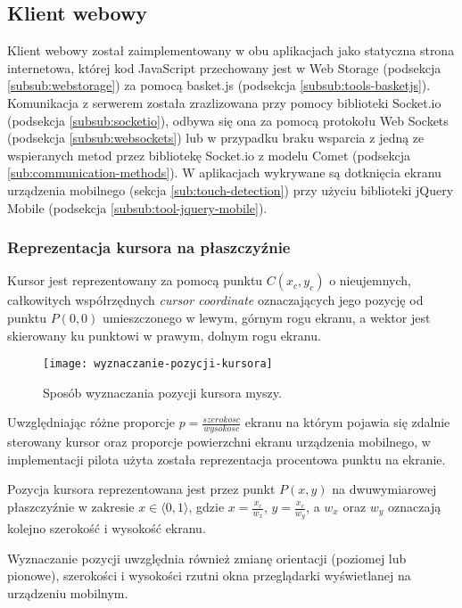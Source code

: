 \subsection{Klient webowy}
\label{subsub:impl-webclient}

Klient webowy został zaimplementowany w obu aplikacjach jako statyczna strona internetowa, której kod JavaScript przechowany jest w Web Storage (podsekcja \ref{subsub:webstorage}) za pomocą basket.js (podsekcja \ref{subsub:tools-basketjs}). Komunikacja z serwerem została zrazlizowana przy pomocy biblioteki Socket.io (podsekcja \ref{subsub:socketio}), odbywa się ona za pomocą protokołu Web Sockets (podsekcja \ref{subsub:websockets}) lub w przypadku braku wsparcia z jedną ze wspieranych metod przez bibliotekę Socket.io z modelu Comet (podsekcja \ref{sub:communication-methods}). W aplikacjach wykrywane są dotknięcia ekranu urządzenia mobilnego (sekcja \ref{sub:touch-detection}) przy użyciu biblioteki jQuery Mobile (podsekcja \ref{subsub:tool-jquery-mobile}).

\subsubsection{Reprezentacja kursora na płaszczyźnie}
\label{subsub:cursor-representation}

Kursor jest reprezentowany za pomocą punktu \(C(x_{c}, y_{c})\) o nieujemnych, całkowitych współrzędnych \emph{cursor coordinate} oznaczających jego pozycję od punktu \(P(0, 0)\) umieszczonego w lewym, górnym rogu ekranu, a wektor jest skierowany ku punktowi w prawym, dolnym rogu ekranu.

\begin{figure}[h!]
  \caption{Sposób wyznaczania pozycji kursora myszy.}
  \centering
    \texttt{[image: wyznaczanie-pozycji-kursora]}
\end{figure}

Uwzględniając różne proporcje \(p = \frac{szerokosc}{wysokosc}\) ekranu na którym pojawia się zdalnie sterowany kursor oraz proporcje powierzchni ekranu urządzenia mobilnego, w implementacji pilota użyta została reprezentacja procentowa punktu na ekranie.

Pozycja kursora reprezentowana jest przez punkt \(P(x, y)\) na dwuwymiarowej płaszczyźnie w zakresie \( x\in \langle0, 1\rangle \), gdzie \(x = \frac{x_{c}}{w_{x}}\), \(y = \frac{x_{c}}{w_{y}}\), a \(w_{x}\) oraz \(w_{y}\) oznaczają kolejno szerokość i wysokość ekranu.

Wyznaczanie pozycji uwzględnia również zmianę orientacji (poziomej lub pionowe), szerokości i wysokości rzutni okna przeglądarki wyświetlanej na urządzeniu mobilnym.

